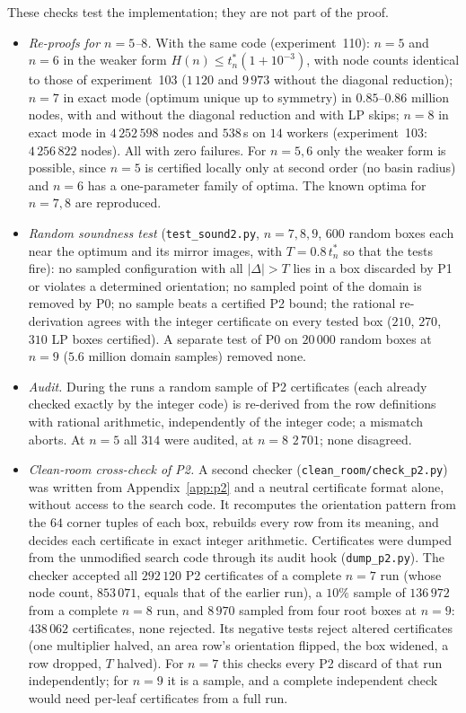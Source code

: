 \documentclass[11pt]{amsart}
\theoremstyle{definition}
\newcommand{\tstar}{t^{*}}
\begin{document}
These checks test the implementation; they are not part of the proof.
\begin{itemize}
\item \emph{Re-proofs for $n = 5$--$8$.} With the same code (experiment~110): $n = 5$ and $n = 6$ in the weaker form $H(n) \le \tstar_n(1+10^{-3})$, with node counts identical to those of experiment~103 ($1\,120$ and $9\,973$ without the diagonal reduction); $n = 7$ in exact mode (optimum unique up to symmetry) in $0.85$--$0.86$ million nodes, with and without the diagonal reduction and with LP skips; $n = 8$ in exact mode in $4\,252\,598$ nodes and $538$\,s on $14$ workers (experiment~103: $4\,256\,822$ nodes). All with zero failures. For $n = 5, 6$ only the weaker form is possible, since $n = 5$ is certified locally only at second order (no basin radius) and $n = 6$ has a one-parameter family of optima. The known optima for $n = 7, 8$ \cite{ZC,DZ} are reproduced. %
\item \emph{Random soundness test} (\texttt{test\_sound2.py}, $n = 7, 8, 9$, $600$ random boxes each near the optimum and its mirror images, with $T = 0.8\,\tstar_n$ so that the tests fire): no sampled configuration with all $\lvert\Delta\rvert > T$ lies in a box discarded by P1 or violates a determined orientation; no sampled point of the domain is removed by P0; no sample beats a certified P2 bound; the rational re-derivation agrees with the integer certificate on every tested box ($210$, $270$, $310$ LP boxes certified). A separate test of P0 on $20\,000$ random boxes at $n = 9$ ($5.6$ million domain samples) removed none. %
\item \emph{Audit.} During the runs a random sample of P2 certificates (each already checked exactly by the integer code) is re-derived from the row definitions with rational arithmetic, independently of the integer code; a mismatch aborts. At $n = 5$ all $314$ were audited, at $n = 8$ $2\,701$; none disagreed. %
\item \emph{Clean-room cross-check of P2.} A second checker (\texttt{clean\_room/check\_p2.py}) was written from Appendix~\ref{app:p2} and a neutral certificate format alone, without access to the search code. It recomputes the orientation pattern from the $64$ corner tuples of each box, rebuilds every row from its meaning, and decides each certificate in exact integer arithmetic. Certificates were dumped from the unmodified search code through its audit hook (\texttt{dump\_p2.py}). The checker accepted all $292\,120$ P2 certificates of a complete $n = 7$ run (whose node count, $853\,071$, equals that of the earlier run), a $10\%$ sample of $136\,972$ from a complete $n = 8$ run, and $8\,970$ sampled from four root boxes at $n = 9$: $438\,062$ certificates, none rejected. Its negative tests reject altered certificates (one multiplier halved, an area row's orientation flipped, the box widened, a row dropped, $T$ halved). For $n = 7$ this checks every P2 discard of that run independently; for $n = 9$ it is a sample, and a complete independent check would need per-leaf certificates from a full run. %

\end{itemize}
\end{document}
